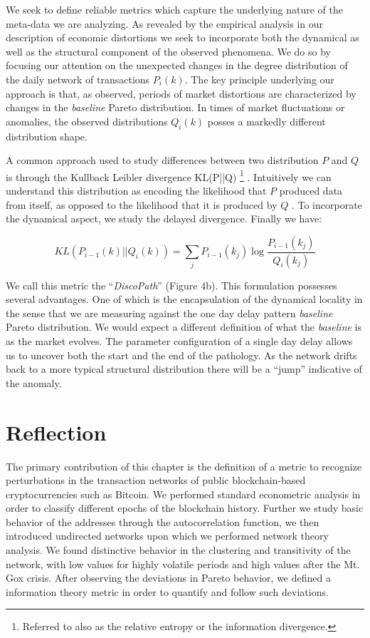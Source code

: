 We seek to define reliable metrics which capture the underlying nature of the meta-data we are analyzing. 
As revealed by the empirical analysis in our description of economic distortions we seek to incorporate both the dynamical as well as the structural component of the observed phenomena. 
We do so by focusing our attention on the unexpected changes in the degree distribution of the daily network of transactions $P_i(k)$. 
The key principle underlying our approach is that, as observed, periods of market distortions are characterized by changes in the \textit{baseline} Pareto distribution.
In times of market fluctuations or anomalies,  the observed distributions $Q_i(k)$ posses a markedly different distribution shape. 

A common approach used to study differences between two distribution $P$ and $Q$ is through the Kullback Leibler divergence  KL(P||Q) \footnote{Referred to also as the relative entropy or the information divergence.}  \cite{Information}.
Intuitively we can understand this distribution as encoding the likelihood that  $P$  produced data from itself, as opposed to the likelihood that it is produced by $Q$ \cite{sloppiness}. 
To incorporate the dynamical aspect, we study the delayed divergence. 
Finally we have:

\begin{equation}
KL(P_{i-1}(k) || Q_i(k)) = \sum_{j}P_{i-1}(k_j)\log{\frac{P_{i-1}(k_j)}{Q_i(k_j)}}
\end{equation}

We call this  metric the ``\textit{DiscoPath}'' (Figure 4b). This formulation possesses several advantages. 
One of which is the encapsulation of the dynamical locality in the sense that we are measuring against the one day delay pattern \textit{baseline} Pareto distribution. 
We would expect a different definition of what the \textit{baseline} is as the market evolves. 
The parameter configuration of a single day delay allows us to uncover both the start and the end of the pathology. 
As the network drifts back to a more typical structural distribution there will be a ``jump''  indicative of the anomaly.

\section{Reflection}

The primary contribution of this chapter is the definition of a metric to recognize perturbations in the transaction networks of public blockchain-based cryptocurrencies such as Bitcoin. 
We performed standard econometric analysis in order to classify different epochs of the blockchain history. 
Further we study basic behavior of the addresses through the autocorrelation function, we then introduced undirected networks upon which we performed network theory analysis.
We found distinctive behavior in the clustering and transitivity of the network, with low values for highly volatile periods and high values after the Mt. Gox crisis. 
After observing the deviations in Pareto behavior, we defined a information theory metric in order to quantify and follow such deviations.

